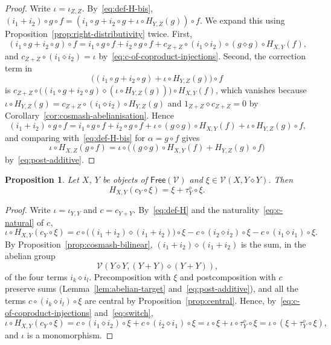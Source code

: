 \documentclass[reqno,a4paper]{amsart}
\theoremstyle{plain}
\newtheorem{proposition}[subsection]{Proposition}
\theoremstyle{definition}
\newcommand{\V}{\ensuremath{\mathcal{V}}}
\newcommand{\Free}{\ensuremath{\mathsf{Free}}}
\newcommand{\cosmash}{\ensuremath{\diamond}}
\newcommand{\cc}[1]{\ensuremath{c_{#1}}}                    %
\newcommand{\swc}[1]{\ensuremath{\tau^{\cosmash}_{#1}}}          %
\begin{document}
\begin{proof}
  Write \(\iota=\iota_{Z,Z}\). By~\eqref{eq:def-H-bis}, \((i_{1}+i_{2})\circ g\circ f=(i_{1}\circ g+i_{2}\circ g+\iota\circ H_{Y,Z}(g))\circ f\). We expand this using Proposition~\ref{prop:right-distributivity} twice. First,
  \[
    (i_{1}\circ g+i_{2}\circ g)\circ f=i_{1}\circ g\circ f+i_{2}\circ g\circ f+\cc{Z+Z}\circ(i_{1}\cosmash i_{2})\circ(g\cosmash g)\circ H_{X,Y}(f)\text{,}
  \]
  and \(\cc{Z+Z}\circ(i_{1}\cosmash i_{2})=\iota\) by~\eqref{eq:c-of-coproduct-injections}. Second, the correction term in
  \[
    \bigl((i_{1}\circ g+i_{2}\circ g)+\iota\circ H_{Y,Z}(g)\bigr)\circ f
  \]
  is \(\cc{Z+Z}\circ\bigl((i_{1}\circ g+i_{2}\circ g)\cosmash(\iota\circ H_{Y,Z}(g))\bigr)\circ H_{X,Y}(f)\), which vanishes because \(\iota\circ H_{Y,Z}(g)=\cc{Z+Z}\circ(i_{1}\cosmash i_{2})\circ H_{Y,Z}(g)\) and \(1_{Z+Z}\cosmash\cc{Z+Z}=0\) by Corollary~\ref{cor:cosmash-abelianisation}. Hence
  \[
    (i_{1}+i_{2})\circ g\circ f=i_{1}\circ g\circ f+i_{2}\circ g\circ f+\iota\circ(g\cosmash g)\circ H_{X,Y}(f)+\iota\circ H_{Y,Z}(g)\circ f\text{,}
  \]
  and comparing with~\eqref{eq:def-H-bis} for \(\alpha=g\circ f\) gives
  \[
    \iota\circ H_{X,Z}(g\circ f)=\iota\circ\bigl((g\cosmash g)\circ H_{X,Y}(f)+H_{Y,Z}(g)\circ f\bigr)
  \]
  by~\eqref{eq:post-additive}.
\end{proof}

\begin{proposition}\label{prop:T-formula}
  Let \(X\), \(Y\) be objects of \(\Free(\V)\) and \(\xi\in\V(X,Y\cosmash Y)\). Then
  \[
    H_{X,Y}(\cc{Y}\circ\xi)=\xi+\swc{Y}\circ\xi\text{.}
  \]
\end{proposition}

\begin{proof}
  Write \(\iota=\iota_{Y,Y}\) and \(c=\cc{Y+Y}\). By~\eqref{eq:def-H} and the naturality~\eqref{eq:c-natural} of \(\cc{}\),
  \[
    \iota\circ H_{X,Y}(\cc{Y}\circ\xi)=c\circ\bigl((i_{1}+i_{2})\cosmash(i_{1}+i_{2})\bigr)\circ\xi-c\circ(i_{2}\cosmash i_{2})\circ\xi-c\circ(i_{1}\cosmash i_{1})\circ\xi\text{.}
  \]
  By Proposition~\ref{prop:cosmash-bilinear}, \((i_{1}+i_{2})\cosmash(i_{1}+i_{2})\) is the sum, in the abelian group
  \[
    \V(Y\cosmash Y,(Y+Y)\cosmash(Y+Y))\text{,}
  \]
  of the four terms \(i_{k}\cosmash i_{l}\). Precomposition with \(\xi\) and postcomposition with \(c\) preserve sums (Lemma~\ref{lem:abelian-target} and~\eqref{eq:post-additive}), and all the terms \(c\circ(i_{k}\cosmash i_{l})\circ\xi\) are central by Proposition~\ref{prop:central}. Hence, by~\eqref{eq:c-of-coproduct-injections} and~\eqref{eq:switch},
  \[
    \iota\circ H_{X,Y}(\cc{Y}\circ\xi)=c\circ(i_{1}\cosmash i_{2})\circ\xi+c\circ(i_{2}\cosmash i_{1})\circ\xi=\iota\circ\xi+\iota\circ\swc{Y}\circ\xi=\iota\circ(\xi+\swc{Y}\circ\xi)\text{,}
  \]
  and \(\iota\) is a monomorphism.
\end{proof}
\end{document}
